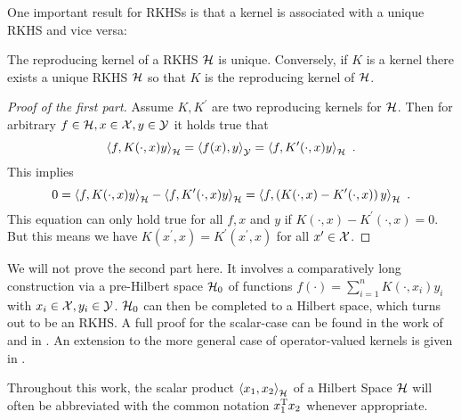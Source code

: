 One important result for RKHSs is that a kernel is associated with a unique RKHS and vice versa:
\begin{theorem}
	\label{theo:kernel-for-rkhs}
	The reproducing kernel of a RKHS $\mathcal{H}$ is unique.
	Conversely, if $K$ is a kernel there exists a unique RKHS $\mathcal{H}$ so that $K$ is the reproducing kernel of $\mathcal{H}$.
\end{theorem}
\begin{proof}[Proof of the first part]
	Assume $K, K^\prime$ are two reproducing kernels for $\mathcal{H}$. 
	Then for arbitrary $f \in \mathcal{H}, x \in \mathcal{X}, y \in \mathcal{Y}$ it holds true that
	\begin{equation}
		\left< f, K(\cdot, x)y\right>_{\mathcal{H}} = \left<f(x), y\right>_{\mathcal{Y}} = \left<f, K^\prime(\cdot, x) y\right>_{\mathcal{H}} \ .
	\end{equation}
	This implies
	\begin{equation}
		0 = \left< f, K(\cdot, x)y\right>_{\mathcal{H}} - \left< f, K^\prime(\cdot, x)y\right>_{\mathcal{H}}
		= \left< f, \left(K(\cdot, x) - K^\prime(\cdot, x)\right)y\right>_{\mathcal{H}} \ .
	\end{equation}
	This equation can only hold true for all $f, x$ and $y$ if $K(\cdot, x) - K^\prime(\cdot, x) = 0$.
	But this means we have $K(x^\prime, x) = K^\prime(x^\prime, x)$ for all $x^\prime \in \mathcal{X}$.	
\end{proof}

We will not prove the second part here.
It involves a comparatively long construction via a pre-Hilbert space $\mathcal{H}_0$ of functions $f(\cdot) = \sum_{i=1}^n K(\cdot, x_i) y_i$ with $x_i \in \mathcal{X}, y_i \in \mathcal{Y}$.
$\mathcal{H}_0$ can then be completed to a Hilbert space, which turns out to be an RKHS.
A full proof for the scalar-case can be found in the work of \citet{aronszajn50} and in \cite{sejdinovic12, berlinet04}.
An extension to the more general case of operator-valued kernels is given in \cite{kadri16}.

Throughout this work, the scalar product $\left< x_1, x_2 \right>_{\mathcal{H}}$ of a Hilbert Space $\mathcal{H}$ will often be abbreviated with the common notation $x_1^{\mathrm{T}} x_2$ whenever appropriate.